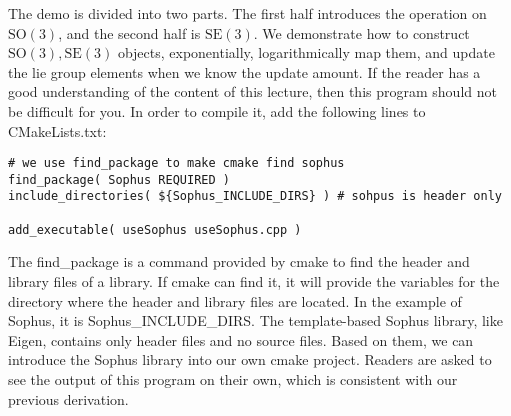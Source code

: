 The demo is divided into two parts. The first half introduces the operation on $\mathrm{SO}(3)$, and the second half is $\mathrm{SE}(3)$. We demonstrate how to construct $\mathrm{SO}(3), \mathrm{SE}(3)$ objects, exponentially, logarithmically map them, and update the lie group elements when we know the update amount. If the reader has a good understanding of the content of this lecture, then this program should not be difficult for you. In order to compile it, add the following lines to CMakeLists.txt:

\begin{lstlisting}[caption=slambook/ch4/useSophus/CMakeLists.txt]
# we use find_package to make cmake find sophus
find_package( Sophus REQUIRED )
include_directories( ${Sophus_INCLUDE_DIRS} ) # sohpus is header only

add_executable( useSophus useSophus.cpp )
\end{lstlisting}

The find\_package is a command provided by cmake to find the header and library files of a library. If cmake can find it, it will provide the variables for the directory where the header and library files are located. In the example of Sophus, it is Sophus\_INCLUDE\_DIRS. The template-based Sophus library, like Eigen, contains only header files and no source files. Based on them, we can introduce the Sophus library into our own cmake project. Readers are asked to see the output of this program on their own, which is consistent with our previous derivation.


